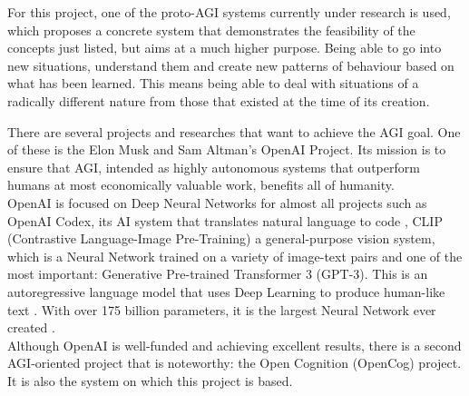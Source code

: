 For this project, one of the proto-AGI\footnotemark{} systems currently under research is used, which proposes a concrete system that demonstrates the feasibility of the concepts just listed, but aims at a much higher purpose. Being able to go into new situations, understand them and create new patterns of behaviour based on what has been learned. This means being able to deal with situations of a radically different nature from those that existed at the time of its creation. \\

There are several projects and researches that want to achieve the AGI goal. One of these is the Elon Musk and Sam Altman's OpenAI Project. 
Its mission is to ensure that AGI, intended as highly autonomous systems that outperform humans at most economically valuable work, benefits all of humanity. \\
OpenAI is focused on Deep Neural Networks for almost all projects such as OpenAI Codex, its AI system that translates natural language to code \cite{DBLP:journals/corr/abs-2107-03374}, CLIP (Contrastive Language-Image Pre-Training) a general-purpose vision system, which is a Neural Network trained on a variety of image-text pairs \cite{DBLP:journals/corr/abs-2103-00020} and one of the most important: Generative Pre-trained Transformer 3 (GPT-3). This is an autoregressive language model that uses Deep Learning to produce human-like text \cite{DBLP:journals/corr/abs-2005-14165}. With over 175 billion parameters, it is the largest Neural Network ever created \cite{romero_2021}. \\
Although OpenAI is well-funded and achieving excellent results, there is a second AGI-oriented project that is noteworthy: the Open Cognition (OpenCog) project. It is also the system on which this project is based. \\

